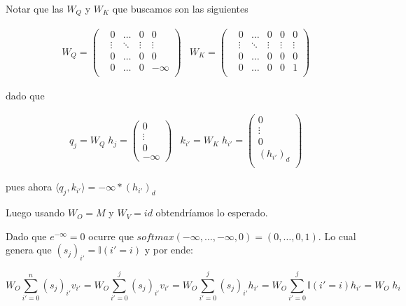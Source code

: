Notar que las $W_Q$ y $W_K$ que buscamos son las siguientes

\begin{align*}
    & W_Q = \left(\begin{matrix}
    &0      &\hdots &0      &0          \\
    &\vdots &\ddots &\vdots &\vdots     \\
    &0      &\hdots &0      &0          \\
    &0      &\hdots &0      &-\infty    \\
\end{matrix}\right)
    &W_K = \left(\begin{matrix}
    &0      &\hdots &0      &0      &0      \\
    &\vdots &\ddots &\vdots &\vdots &\vdots \\
    &0      &\hdots &0      &0      &0      \\
    &0      &\hdots &0      &0      &1      \\
\end{matrix}\right)
\end{align*}


dado que


\begin{align*}
    &q_{j} = W_Q \; h_j = \left(\begin{matrix}
        0 \\
        \vdots \\
        0 \\
        -\infty
    \end{matrix}\right)
    &k_{i'} = W_K \; h_{i'} = \left(\begin{matrix}
        0 \\
        \vdots \\
        0 \\
        (h_{i'})_{d} \\
    \end{matrix}\right)
\end{align*}

pues ahora $\langle q_{j}, k_{i'} \rangle = -\infty *(h_{i'})_{d}$

\bigskip

Luego usando $W_O = M$ y $W_V = id$ obtendríamos lo esperado.

Dado que $e^{-\infty} = 0$ ocurre que $softmax(-\infty, \dots, -\infty, 0) = (0, \dots, 0, 1)$. Lo cual genera que $(s_j)_{i'} = \mathbb{I}(i' = i)$ y por ende:

\[
  W_O \sum_{i'=0}^{n} (s_j)_{i'} v_{i'} = 
  W_O \sum_{i'=0}^{j} (s_j)_{i'} v_{i'} = 
  W_O \sum_{i'=0}^{j} (s_j)_{i'} h_{i'} = 
  W_O \sum_{i'=0}^{j} \mathbb{I}(i' = i) h_{i'} = 
  W_O \; h_i
\]















